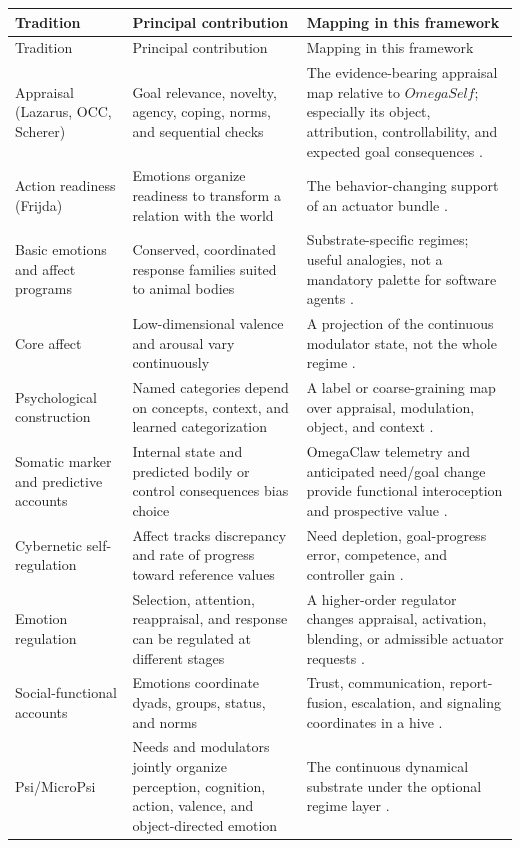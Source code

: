 \documentclass[11pt]{article}
\newcommand{\OmegaSelf}{\ensuremath{\mathit{OmegaSelf}}}
\begin{document}
\begin{longtable}{p{}p{}p{}}
\toprule
Tradition & Principal contribution & Mapping in this framework \\
\midrule
\endfirsthead
\toprule
Tradition & Principal contribution & Mapping in this framework \\
\midrule
\endhead
Appraisal (Lazarus, OCC, Scherer) & Goal relevance, novelty, agency, coping,
norms, and sequential checks & The evidence-bearing appraisal map relative to
\OmegaSelf{}; especially its object, attribution, controllability, and expected
goal consequences \cite{lazarus1991,occ1988,scherer2001}. \\
Action readiness (Frijda) & Emotions organize readiness to transform a relation
with the world & The behavior-changing support of an actuator bundle
\cite{frijda1986}. \\
Basic emotions and affect programs & Conserved, coordinated response families
suited to animal bodies & Substrate-specific regimes; useful analogies, not a
mandatory palette for software agents \cite{ekman1992,panksepp1998}. \\
Core affect & Low-dimensional valence and arousal vary continuously & A
projection of the continuous modulator state, not the whole regime
\cite{russell2003}. \\
Psychological construction & Named categories depend on concepts, context, and
learned categorization & A label or coarse-graining map over appraisal,
modulation, object, and context \cite{barrett2006}. \\
Somatic marker and predictive accounts & Internal state and predicted bodily or
control consequences bias choice & OmegaClaw telemetry and anticipated
need/goal change provide functional interoception and prospective value
\cite{damasio1994,seth2013}. \\
Cybernetic self-regulation & Affect tracks discrepancy and rate of progress
toward reference values & Need depletion, goal-progress error, competence, and
controller gain \cite{carver1998}. \\
Emotion regulation & Selection, attention, reappraisal, and response can be
regulated at different stages & A higher-order regulator changes appraisal,
activation, blending, or admissible actuator requests \cite{gross1998}. \\
Social-functional accounts & Emotions coordinate dyads, groups, status, and
norms & Trust, communication, report-fusion, escalation, and signaling
coordinates in a hive \cite{keltner1999}. \\
Psi/MicroPsi & Needs and modulators jointly organize perception, cognition,
action, valence, and object-directed emotion & The continuous dynamical substrate
under the optional regime layer \cite{bach2018}. \\
\bottomrule
\end{longtable}
\end{document}
